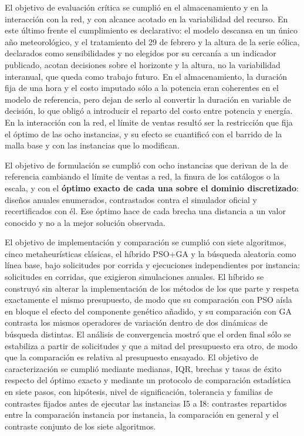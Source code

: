 El objetivo de evaluación crítica se cumplió en el almacenamiento y en la interacción con la red, y con alcance acotado en la variabilidad del recurso. En este último frente el cumplimiento es declarativo: el modelo descansa en un único año meteorológico, y el tratamiento del 29 de febrero y la altura de la serie eólica, declarados como sensibilidades y no elegidos por su cercanía a un indicador publicado, acotan decisiones sobre el horizonte y la altura, no la variabilidad interanual, que queda como trabajo futuro. En el almacenamiento, la duración fija de una hora y el costo imputado sólo a la potencia eran coherentes en el modelo de referencia, pero dejan de serlo al convertir la duración en variable de decisión, lo que obligó a introducir el reparto del costo entre potencia y energía. En la interacción con la red, el límite de ventas resultó ser la restricción que fija el óptimo de las ocho instancias, y su efecto se cuantificó con el barrido de la malla base y con las instancias que lo modifican.

El objetivo de formulación se cumplió con ocho instancias que derivan de la de referencia cambiando el límite de ventas a red, la finura de los catálogos o la escala, y con el \textbf{óptimo exacto de cada una sobre el dominio discretizado}: \BruteForceDesignsTotal{} diseños anuales enumerados, contrastados contra el simulador oficial y recertificados con él. Ese óptimo hace de cada brecha una distancia a un valor conocido y no a la mejor solución observada.

El objetivo de implementación y comparación se cumplió con siete algoritmos, cinco metaheurísticas clásicas, el híbrido PSO+GA y la búsqueda aleatoria como línea base, bajo \RequestsPerRun{} solicitudes por corrida y \Replicates{} ejecuciones independientes por instancia: \TotalDesignRequests{} solicitudes en \TotalRuns{} corridas, que exigieron \SimulationsTotal{} simulaciones anuales. El híbrido se construyó sin alterar la implementación de los métodos de los que parte y respeta exactamente el mismo presupuesto, de modo que su comparación con PSO aísla en bloque el efecto del componente genético añadido, y su comparación con GA contrasta los mismos operadores de variación dentro de dos dinámicas de búsqueda distintas. El análisis de convergencia mostró que el orden final sólo se estabiliza a partir de \ConvSettleFrom{} solicitudes y que a mitad del presupuesto era otro, de modo que la comparación es relativa al presupuesto ensayado. El objetivo de caracterización se cumplió mediante medianas, IQR, brechas y tasas de éxito respecto del óptimo exacto y mediante un protocolo de comparación estadística en siete pasos, con hipótesis, nivel de significación, tolerancia y familias de contrastes fijados antes de ejecutar las instancias I5 a I8: \StatTestsTotal{} contrastes repartidos entre la comparación instancia por instancia, la comparación en general y el contraste conjunto de los siete algoritmos.

